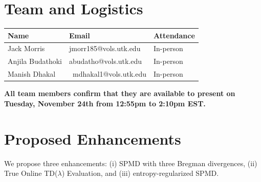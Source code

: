 \documentclass[11pt]{article}
\begin{document}
\makeheaderbox

\section{Team and Logistics}

\noindent
\begin{tabular}{@{}lll@{}}
\toprule
Name & Email & Attendance \\
\midrule
{Jack Morris} & {jmorr185@vols.utk.edu} & In-person \\
{Anjila Budathoki} & {abudatho@vols.utk.edu} & In-person \\
{Manish Dhakal} & \ {mdhakal1@vols.utk.edu} & In-person \\
\bottomrule
\end{tabular}

\vspace{0.5\baselineskip}
\noindent
\textbf{All team members confirm that they are available to present on Tuesday,
November 24th from 12:55pm to 2:10pm EST.}


\section{Proposed Enhancements}


We propose three enhancements:
(i) SPMD with three Bregman divergences, (ii) True Online TD(\texorpdfstring{$\lambda$}{lambda}) Evaluation, and (iii) entropy-regularized SPMD.
\end{document}
